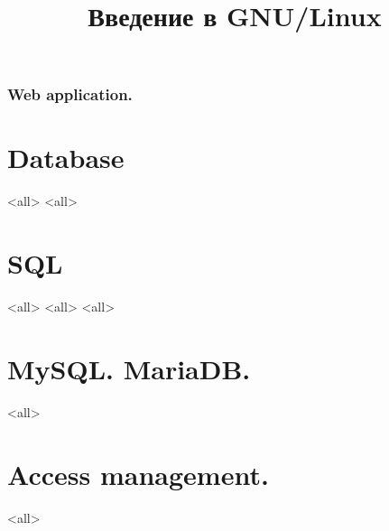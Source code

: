 

\title{Введение в GNU/Linux}




\begin{frame}
	\frametitle{Web application.}
	\titlepage
	\vspace{-0.5cm}
	\begin{center}
	\end{center}
\end{frame}


\begin{frame}
	\tableofcontents
	[hideallsubsections]
\end{frame}


\section{Database}
\mode<all>{}
\mode<all>{}
\section{SQL}
\mode<all>{}
\mode<all>{}
\mode<all>{}
\section{MySQL. MariaDB.}
\mode<all>{}
\section{Access management.}
\mode<all>{}


